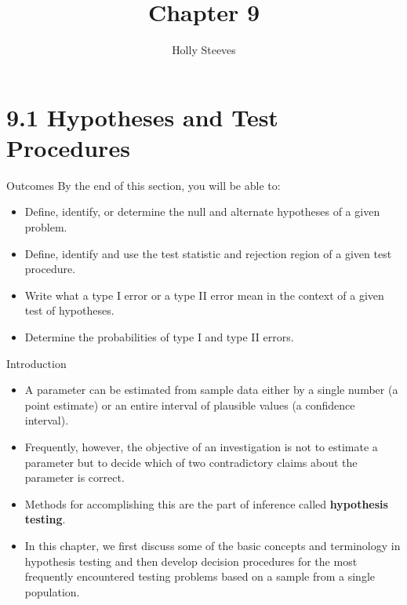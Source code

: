 \documentclass[
  ignorenonframetext,
]{beamer}
\title{Chapter 9}
\author{Holly Steeves}
\date{}
\providecommand{\tightlist}{%
  \setlength{\itemsep}{0pt}\setlength{\parskip}{0pt}}\usepackage{longtable,booktabs,array}
\begin{document}
\frame{\titlepage}
\ifdefined\Shaded\renewenvironment{Shaded}{\begin{tcolorbox}[interior hidden, enhanced, sharp corners, borderline west={3pt}{0pt}{shadecolor}, breakable, frame hidden, boxrule=0pt]}{\end{tcolorbox}}\fi

\hypertarget{hypotheses-and-test-procedures}{%
\section{9.1 Hypotheses and Test
Procedures}\label{hypotheses-and-test-procedures}}

\begin{frame}{Outcomes}
\protect\hypertarget{outcomes}{}
By the end of this section, you will be able to:

\begin{itemize}[<+->]
\tightlist
\item
  Define, identify, or determine the null and alternate hypotheses of a
  given problem.
\item
  Define, identify and use the test statistic and rejection region of a
  given test procedure.
\item
  Write what a type I error or a type II error mean in the context of a
  given test of hypotheses.
\item
  Determine the probabilities of type I and type II errors.
\end{itemize}
\end{frame}

\begin{frame}{Introduction}
\protect\hypertarget{introduction}{}
\begin{itemize}[<+->]
\tightlist
\item
  A parameter can be estimated from sample data either by a single
  number (a point estimate) or an entire interval of plausible values (a
  confidence interval).
\item
  Frequently, however, the objective of an investigation is not to
  estimate a parameter but to decide which of two contradictory claims
  about the parameter is correct.
\item
  Methods for accomplishing this are the part of inference called
  \textbf{hypothesis testing}.
\item
  In this chapter, we first discuss some of the basic concepts and
  terminology in hypothesis testing and then develop decision procedures
  for the most frequently encountered testing problems based on a sample
  from a single population.
\end{itemize}
\end{frame}
\end{document}
